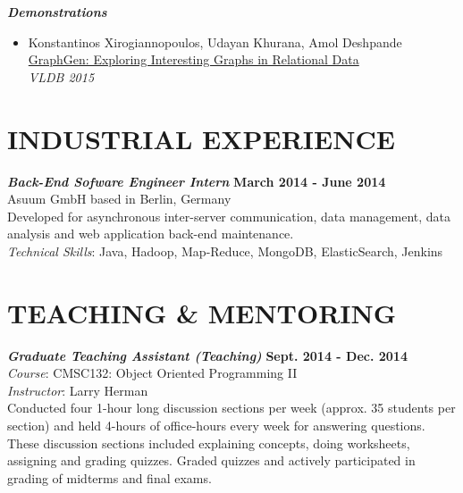 \documentclass[margin, 10pt]{res} %
\begin{document}
\begin{resume}
{\sl \textbf{Demonstrations} }\\
\begin{itemize}
  \item Konstantinos Xirogiannopoulos, Udayan Khurana, Amol Deshpande\\
  \href{http://www.vldb.org/pvldb/vol8/p2032-xirogiannopoulos.pdf}{GraphGen: Exploring Interesting Graphs in Relational Data}\\
  \textit{VLDB 2015}
\end{itemize}


\section{INDUSTRIAL EXPERIENCE}

{\sl \textbf{Back-End Sofware Engineer Intern} } \hfill \textbf{March 2014 - June 2014}\\
Asuum GmbH based in Berlin, Germany\\
Developed for asynchronous inter-server communication, data management, data analysis and web application back-end maintenance.\\
\textit{Technical Skills}: Java, Hadoop, Map-Reduce, MongoDB, ElasticSearch, Jenkins


\section{TEACHING \& MENTORING}

{\sl \textbf{Graduate Teaching Assistant (Teaching)}} \hfill \textbf{Sept. 2014 - Dec. 2014}\\
\textit{Course}: CMSC132: Object Oriented Programming II \\
\textit{Instructor}: Larry Herman\\
Conducted four 1-hour long discussion sections per week (approx. 35 students per section) and held 4-hours of office-hours every week for answering questions. These discussion sections included explaining concepts, doing worksheets, assigning and grading quizzes. Graded quizzes and actively participated in grading of midterms and final exams.




\end{resume}
\end{document}
